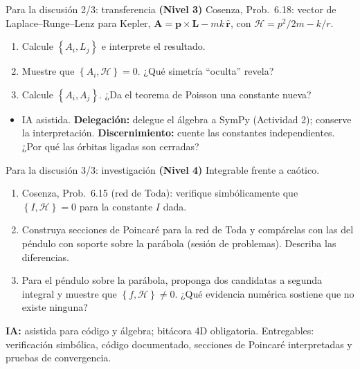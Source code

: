 \documentclass[spanish]{beamer}
\newcommand{\Ham}{\mathcal{H}}
\newcommand{\pb}[2]{\left\{#1,#2\right\}}   %
\begin{document}
\begin{frame}{Para la discusión 2/3: transferencia}
\textbf{(Nivel 3)} Cosenza, Prob.~6.18: vector de Laplace--Runge--Lenz para Kepler,
$\mathbf A = \mathbf p\times\mathbf L - mk\,\hat{\mathbf r}$, con
$\Ham = p^2/2m - k/r$.
\begin{enumerate}
  \item Calcule $\pb{A_i}{L_j}$ e interprete el resultado.
  \item Muestre que $\pb{A_i}{\Ham}=0$. ¿Qué simetría ``oculta'' revela?
  \item Calcule $\pb{A_i}{A_j}$. ¿Da el teorema de Poisson una constante nueva?
\end{enumerate}
\begin{itemize}
  \item IA asistida. \textbf{Delegación:} delegue el álgebra a SymPy
        (Actividad 2); conserve la interpretación. \textbf{Discernimiento:}
        cuente las constantes independientes. ¿Por qué las órbitas ligadas son
        cerradas?
\end{itemize}
\end{frame}

\begin{frame}{Para la discusión 3/3: investigación}
\textbf{(Nivel 4)} Integrable frente a caótico.
\begin{enumerate}
  \item Cosenza, Prob.~6.15 (red de Toda): verifique simbólicamente que
        $\pb{I}{\Ham}=0$ para la constante $I$ dada.
  \item Construya secciones de Poincaré para la red de Toda y compárelas con las del
        péndulo con soporte sobre la parábola (sesión de problemas). Describa las
        diferencias.
  \item Para el péndulo sobre la parábola, proponga dos candidatas a segunda integral y
        muestre que $\pb{f}{\Ham}\neq 0$. ¿Qué evidencia numérica sostiene que no
        existe ninguna?
\end{enumerate}
\textbf{IA:} asistida para código y álgebra; bitácora 4D obligatoria.
Entregables: verificación simbólica, código documentado, secciones de Poincaré
interpretadas y pruebas de convergencia.
\end{frame}
\end{document}
